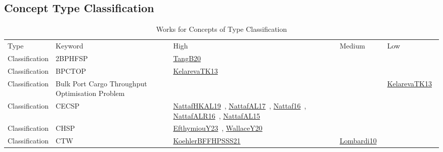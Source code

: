 \clearpage
\subsection{Concept Type Classification}
\label{sec:Classification}
{\scriptsize
\begin{longtable}{lp{3cm}>{\raggedright\arraybackslash}p{6cm}>{\raggedright\arraybackslash}p{6cm}>{\raggedright\arraybackslash}p{8cm}}
\rowcolor{white}\caption{Works for Concepts of Type Classification}\\ \toprule
\rowcolor{white}Type & Keyword & High & Medium & Low\\ \midrule\endhead
\bottomrule
\endfoot
Classification & 2BPHFSP & \href{../works/TangB20.pdf}{TangB20}~\cite{TangB20} &  & \\
Classification & BPCTOP & \href{../works/KelarevaTK13.pdf}{KelarevaTK13}~\cite{KelarevaTK13} &  & \\
Classification & Bulk Port Cargo Throughput Optimisation Problem &  &  & \href{../works/KelarevaTK13.pdf}{KelarevaTK13}~\cite{KelarevaTK13}\\
Classification & CECSP & \href{../works/NattafHKAL19.pdf}{NattafHKAL19}~\cite{NattafHKAL19}, \href{../works/NattafAL17.pdf}{NattafAL17}~\cite{NattafAL17}, \href{../works/Nattaf16.pdf}{Nattaf16}~\cite{Nattaf16}, \href{../works/NattafALR16.pdf}{NattafALR16}~\cite{NattafALR16}, \href{../works/NattafAL15.pdf}{NattafAL15}~\cite{NattafAL15} &  & \\
Classification & CHSP & \href{../works/EfthymiouY23.pdf}{EfthymiouY23}~\cite{EfthymiouY23}, \href{../works/WallaceY20.pdf}{WallaceY20}~\cite{WallaceY20} &  & \\
Classification & CTW & \href{../works/KoehlerBFFHPSSS21.pdf}{KoehlerBFFHPSSS21}~\cite{KoehlerBFFHPSSS21} & \href{../works/Lombardi10.pdf}{Lombardi10}~\cite{Lombardi10} & \\

\end{longtable}}
